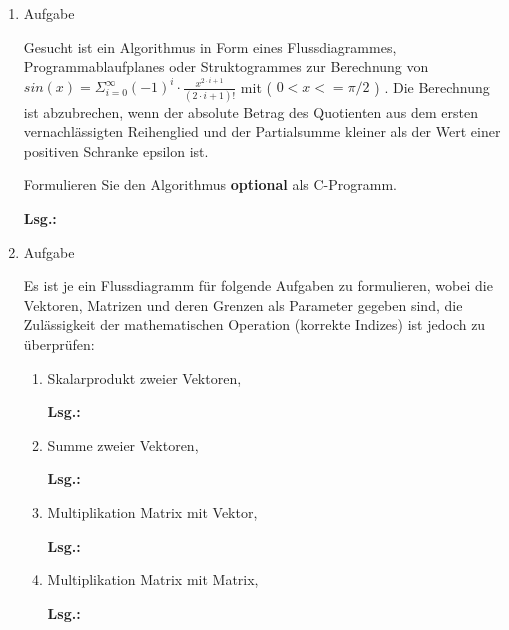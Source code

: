 \documentclass[12pt,a4paper,ngerman]{scrreprt}
\newcommand{\Lsg}{\par \textbf{Lsg.: } \hfill}
\begin{document}
\begin{enumerate}
\Lsg

\item Aufgabe %

Gesucht ist ein Algorithmus in Form eines Flussdiagrammes, Programmablaufplanes oder Struktogrammes zur Berechnung von
\begin{math}
sin(x)=\Sigma_{i=0}^{\infty} (-1)^i \cdot \frac{x^{2 \cdot i+1}}{(2 \cdot i + 1)!}
\end{math}
mit ( $0 < x <= \pi/2$ ) . Die Berechnung ist abzubrechen, wenn der absolute Betrag des Quotienten
aus dem ersten vernachlässigten Reihenglied und der Partialsumme kleiner als der Wert einer
positiven Schranke epsilon ist. \par Formulieren Sie den Algorithmus \textbf{optional} als C-Programm.

\Lsg

\item Aufgabe %

Es ist je ein Flussdiagramm für folgende Aufgaben zu formulieren, wobei die Vektoren, Matrizen und deren Grenzen als Parameter gegeben sind, die Zulässigkeit der mathematischen Operation (korrekte Indizes) ist jedoch zu überprüfen:

\begin{enumerate}
\item Skalarprodukt zweier Vektoren,

\Lsg



\item Summe zweier Vektoren,

\Lsg



\item Multiplikation Matrix mit Vektor,

\Lsg


\item Multiplikation Matrix mit Matrix,

\Lsg

%


\end{enumerate}
\end{enumerate}
\end{document}
